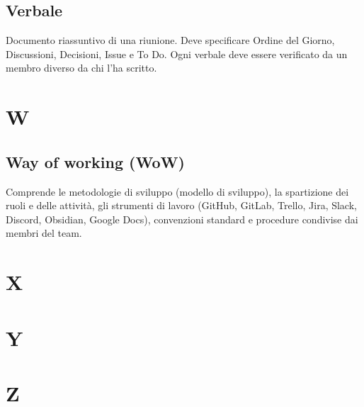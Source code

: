 \documentclass[a4paper,12pt]{article}
\begin{document}
\subsection{Verbale}
Documento riassuntivo di una riunione. Deve specificare Ordine del Giorno, Discussioni, Decisioni, Issue e To Do.  
Ogni verbale deve essere verificato da un membro diverso da chi l’ha scritto.

\section{W}

\subsection{Way of working (WoW)}
Comprende le metodologie di sviluppo (modello di sviluppo), la spartizione dei ruoli e delle attività, gli strumenti di lavoro (GitHub, GitLab, Trello, Jira, Slack, Discord, Obsidian, Google Docs), convenzioni standard e procedure condivise dai membri del team.

\section{X}

\section{Y}

\section{Z}
\end{document}
